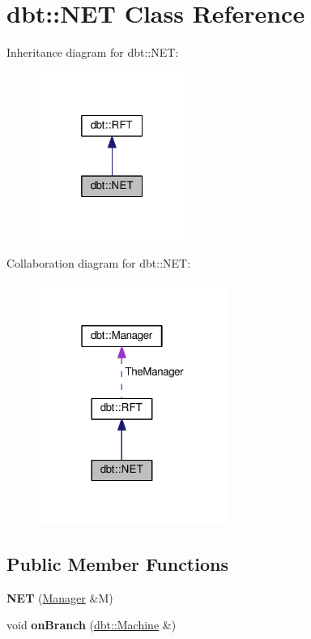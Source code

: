 \hypertarget{classdbt_1_1_n_e_t}{}\section{dbt\+:\+:N\+ET Class Reference}
\label{classdbt_1_1_n_e_t}


Inheritance diagram for dbt\+:\+:N\+ET\+:\nopagebreak
\begin{figure}[H]
\begin{center}
\leavevmode
\includegraphics[width=136pt]{classdbt_1_1_n_e_t__inherit__graph}
\end{center}
\end{figure}


Collaboration diagram for dbt\+:\+:N\+ET\+:\nopagebreak
\begin{figure}[H]
\begin{center}
\leavevmode
\includegraphics[width=175pt]{classdbt_1_1_n_e_t__coll__graph}
\end{center}
\end{figure}
\subsection*{Public Member Functions}
\begin{DoxyCompactItemize}
\item 
{\bfseries N\+ET} (\hyperlink{classdbt_1_1_manager}{Manager} \&M)\hypertarget{classdbt_1_1_n_e_t_aa6213fa828d1fd3188d539266422b45b}{}\label{classdbt_1_1_n_e_t_aa6213fa828d1fd3188d539266422b45b}

\item 
void {\bfseries on\+Branch} (\hyperlink{classdbt_1_1_machine}{dbt\+::\+Machine} \&)\hypertarget{classdbt_1_1_n_e_t_a244d16dc27c1001b5bfc4f07b428a786}{}\label{classdbt_1_1_n_e_t_a244d16dc27c1001b5bfc4f07b428a786}

\end{DoxyCompactItemize}
